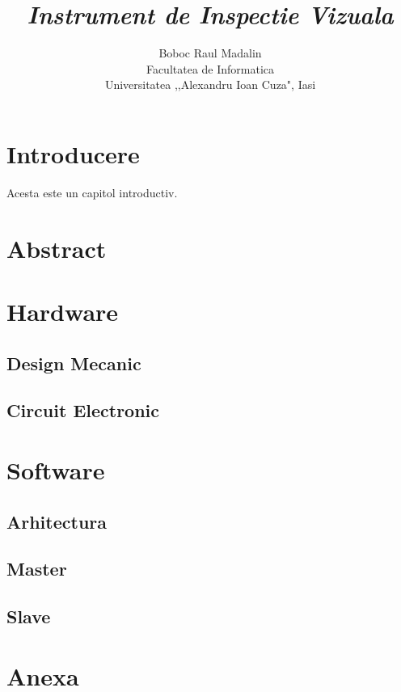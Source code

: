 \documentclass[11pt,a4paper]{report}
\title{\textit{Instrument de Inspectie Vizuala}}
\author{Boboc Raul Madalin\\
        Facultatea de Informatica\\
        Universitatea
        ,\hspace{-0.02cm},Alexandru Ioan Cuza", Iasi}
\begin{document}
\maketitle

% 
\tableofcontents
\thispagestyle{empty}

\fancyhf{}
\clearpage
{}

\chapter*{Introducere}
Acesta este un capitol introductiv.
\newpage

\chapter*{Abstract}

\chapter{Hardware}
\section{Design Mecanic}
\section{Circuit Electronic}

\chapter{Software}
\section{Arhitectura}
\section{Master}
\section{Slave}

\appendix
\chapter*{Anexa}


\begin{thebibliography}{99}
    
\end{thebibliography}
\end{document}
